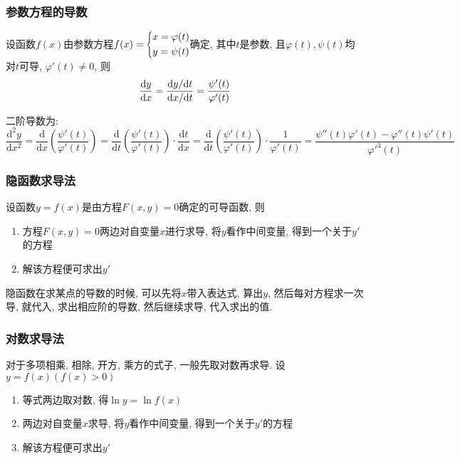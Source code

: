\subsubsection{参数方程的导数}
设函数$ f(x) $由参数方程$ f(x)=\scaleleftright[6pt]{\biggl\{}{
\begin{aligned}
& x=\varphi (t) \\
& y=\psi (t)
\end{aligned}
}{.} $确定, 其中$ t $是参数, 且$ \varphi(t), \psi(t) $均对$ t $可导, $ \varphi'(t)\neq 0 $, 则
\begin{equation*}
\dv{y}{x}=\frac{\mathrm{d}y/\mathrm{d}t}{\mathrm{d}x/\mathrm{d}t}=\frac{\psi'(t)}{\varphi'(t)}
\end{equation*}\par
二阶导数为:
\begin{equation*}
\frac{\mathrm{d}^{2}y}{\mathrm{d}x^{2}}=\frac{\mathrm{d}}{\mathrm{d}x}(\frac{\psi'(t)}{\varphi'(t)})=\frac{\mathrm{d}}{\mathrm{d}t}(\frac{\psi'(t)}{\varphi'(t)})\cdot\frac{\mathrm{d}t}{\mathrm{d}x}=\frac{\mathrm{d}}{\mathrm{d}t}(\frac{\psi'(t)}{\varphi'(t)})\cdot\frac{1}{\varphi'(t)}=\frac{\psi''(t)\varphi'(t)-\varphi''(t)\psi'(t)}{\varphi'^{3}(t)}
\end{equation*}
\subsubsection{隐函数求导法}
设函数$ y=f(x) $是由方程$ F(x,y)=0 $确定的可导函数, 则
\begin{enumerate}
\item 方程$ F(x,y)=0 $两边对自变量$ x $进行求导, 将$ y $看作中间变量, 得到一个关于$ y' $的方程
\item 解该方程便可求出$ y' $
\end{enumerate}
\begin{tcolorbox}
隐函数在求某点的导数的时候, 可以先将$ x $带入表达式, 算出$ y $, 然后每对方程求一次导, 就代入, 求出相应阶的导数, 然后继续求导, 代入求出的值.
\end{tcolorbox}
\subsubsection{对数求导法}
对于多项相乘, 相除, 开方, 乘方的式子, 一般先取对数再求导. 设$ y=f(x)(f(x)>0) $
\begin{enumerate}
\item 等式两边取对数, 得$ \ln y=\ln f(x) $
\item 两边对自变量$ x $求导, 将$ y $看作中间变量, 得到一个关于$ y' $的方程
\item 解该方程便可求出$ y' $
\end{enumerate}
